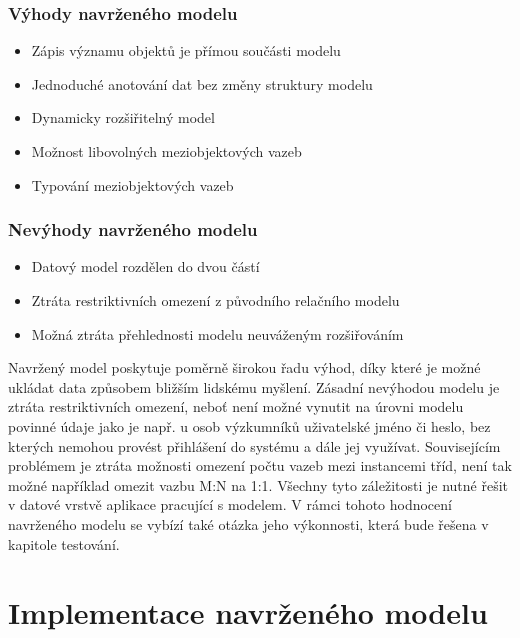 \documentclass{projekt}
\begin{document}
\subsection{Výhody navrženého modelu}

\begin{itemize}
\item Zápis významu objektů je přímou součásti modelu
\item Jednoduché anotování dat bez změny struktury modelu
\item Dynamicky rozšiřitelný model
\item Možnost libovolných meziobjektových  vazeb
\item Typování meziobjektových vazeb
\end{itemize}


\subsection{Nevýhody navrženého modelu}

\begin{itemize}
\item Datový model rozdělen do dvou částí
\item Ztráta restriktivních omezení z původního relačního modelu
\item Možná ztráta přehlednosti modelu neuváženým rozšiřováním
\end{itemize}

Navržený model poskytuje poměrně širokou řadu výhod, díky které je možné ukládat data způsobem bližším lidskému myšlení. Zásadní nevýhodou modelu je ztráta restriktivních omezení, neboť není možné vynutit na úrovni modelu povinné údaje jako je např. u osob výzkumníků uživatelské jméno či heslo, bez kterých nemohou provést přihlášení do systému a dále jej využívat. Souvisejícím problémem je ztráta možnosti omezení počtu vazeb mezi instancemi tříd, není tak možné například omezit vazbu M:N na 1:1. Všechny tyto záležitosti je nutné řešit v datové vrstvě aplikace pracující s modelem. V rámci tohoto hodnocení navrženého modelu se vybízí také otázka jeho výkonnosti, která bude řešena v kapitole testování.


\chapter{Implementace navrženého modelu}
\end{document}
